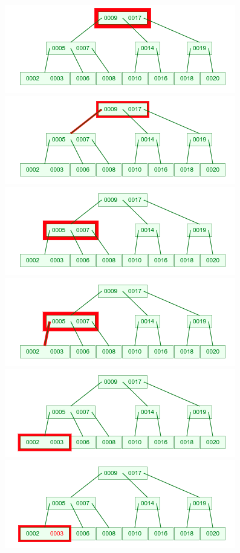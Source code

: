 \documentclass[12pt]{article}
\begin{document}
	\begin{center}
	\includegraphics[width=0.7\linewidth]{graphics/b-trees/find/find-1.png} \\
	\includegraphics[width=0.7\linewidth]{graphics/b-trees/find/find-2.png} \\
	\includegraphics[width=0.7\linewidth]{graphics/b-trees/find/find-3.png} \\
	\includegraphics[width=0.7\linewidth]{graphics/b-trees/find/find-4.png} \\
	\includegraphics[width=0.7\linewidth]{graphics/b-trees/find/find-5.png} \\
	\includegraphics[width=0.7\linewidth]{graphics/b-trees/find/find-6.png} \\
	\end{center}
\end{document}
